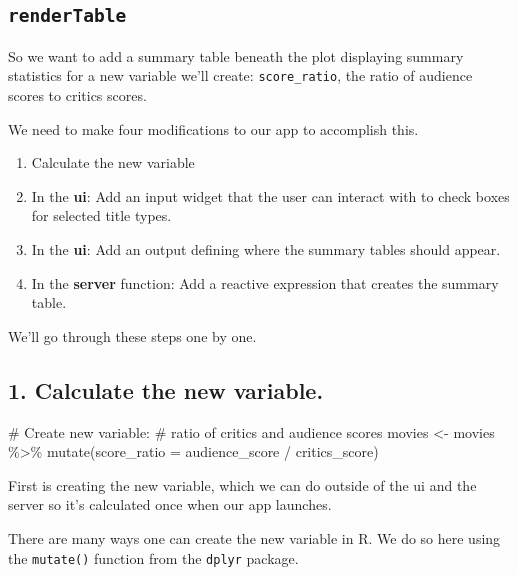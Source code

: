 \documentclass[
  letterpaper,
  DIV=11,
  numbers=noendperiod]{scrreprt}
\newenvironment{Shaded}{\begin{snugshade}}{\end{snugshade}}
\newcommand{\AttributeTok}[1]{\textcolor[rgb]{0.40,0.46,0.14}{#1}}
\newcommand{\CommentTok}[1]{\textcolor[rgb]{0.37,0.37,0.37}{#1}}
\newcommand{\FunctionTok}[1]{\textcolor[rgb]{0.28,0.35,0.67}{#1}}
\newcommand{\NormalTok}[1]{\textcolor[rgb]{0.00,0.46,0.62}{#1}}
\newcommand{\OtherTok}[1]{\textcolor[rgb]{0.00,0.46,0.62}{#1}}
\newcommand{\SpecialCharTok}[1]{\textcolor[rgb]{0.37,0.37,0.37}{#1}}
\providecommand{\tightlist}{%
  \setlength{\itemsep}{0pt}\setlength{\parskip}{0pt}}
\begin{document}
\hypertarget{rendertable}{%
\subsection{\texorpdfstring{\texttt{renderTable}}{renderTable}}\label{rendertable}}

So we want to add a summary table beneath the plot displaying summary
statistics for a new variable we'll create: \texttt{score\_ratio}, the
ratio of audience scores to critics scores.

We need to make four modifications to our app to accomplish this.

\begin{enumerate}
\def\labelenumi{\arabic{enumi}.}
\tightlist
\item
  Calculate the new variable
\item
  In the \textbf{ui}: Add an input widget that the user can interact
  with to check boxes for selected title types.
\item
  In the \textbf{ui}: Add an output defining where the summary tables
  should appear.
\item
  In the \textbf{server} function: Add a reactive expression that
  creates the summary table.
\end{enumerate}

We'll go through these steps one by one.

\hypertarget{calculate-the-new-variable.}{%
\subsection{1. Calculate the new
variable.}\label{calculate-the-new-variable.}}

\begin{Shaded}
\begin{Highlighting}[]
\CommentTok{\# Create new variable:}
\CommentTok{\# ratio of critics and audience scores}
\NormalTok{movies }\OtherTok{\textless{}{-}}\NormalTok{ movies }\SpecialCharTok{\%\textgreater{}\%}
  \FunctionTok{mutate}\NormalTok{(}\AttributeTok{score\_ratio =}\NormalTok{ audience\_score }\SpecialCharTok{/}\NormalTok{ critics\_score)}
\end{Highlighting}
\end{Shaded}

First is creating the new variable, which we can do outside of the ui
and the server so it's calculated once when our app launches.

There are many ways one can create the new variable in R. We do so here
using the \texttt{mutate()} function from the \texttt{dplyr} package.
\end{document}
